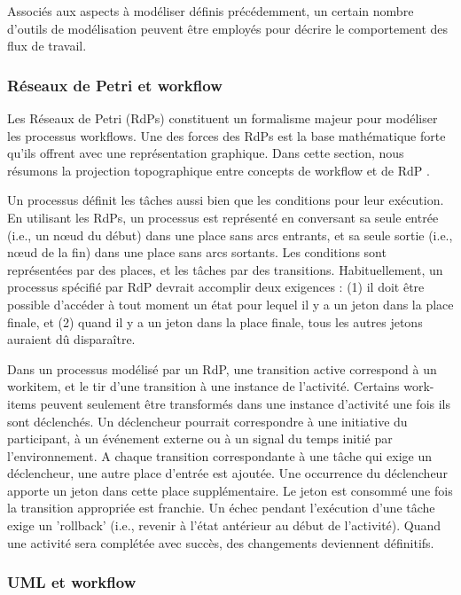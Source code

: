 Associés aux aspects à modéliser définis précédemment, un certain nombre d'outils de modélisation peuvent être employés pour décrire le comportement des flux de travail.

\subsubsection{Réseaux de Petri et workflow
}
Les Réseaux de Petri (RdPs) \parencite{RdPs} constituent un formalisme majeur pour modéliser les processus workflows. Une des forces des RdPs est la base mathématique forte qu'ils offrent avec une représentation graphique. Dans cette section, nous résumons la projection topographique entre concepts de workflow et de RdP .%

Un processus définit les tâches aussi bien que les conditions pour leur exécution. En utilisant les RdPs, un processus est représenté en conversant sa seule entrée (i.e., un nœud du début) dans une place sans arcs entrants, et sa seule sortie (i.e., nœud de la fin) dans une place sans arcs sortants. Les conditions sont représentées par des places, et les tâches par des transitions. Habituellement, un processus spécifié par RdP devrait accomplir deux exigences : (1) il doit être possible d'accéder à tout moment un état pour lequel il y a un jeton dans la place finale, et (2) quand il y a un jeton dans la place finale, tous les autres jetons auraient dû disparaître.

Dans un processus modélisé par un RdP, une transition active correspond à un workitem, et le tir d'une transition à une instance de l'activité. Certains work-items peuvent seulement être transformés dans une instance d'activité une fois ils sont déclenchés. Un déclencheur pourrait correspondre à une initiative du participant, à un événement externe ou à un signal du temps initié par l'environnement. A chaque transition correspondante à une tâche qui exige un déclencheur, une autre place d'entrée est ajoutée. Une occurrence du déclencheur apporte un jeton dans cette place supplémentaire. Le jeton est consommé une fois la transition appropriée est franchie. Un échec pendant l'exécution d'une tâche exige un 'rollback' (i.e., revenir à l'état antérieur au début de l'activité). Quand une activité sera complétée avec succès, des changements deviennent définitifs.

\subsubsection{UML et workflow}


